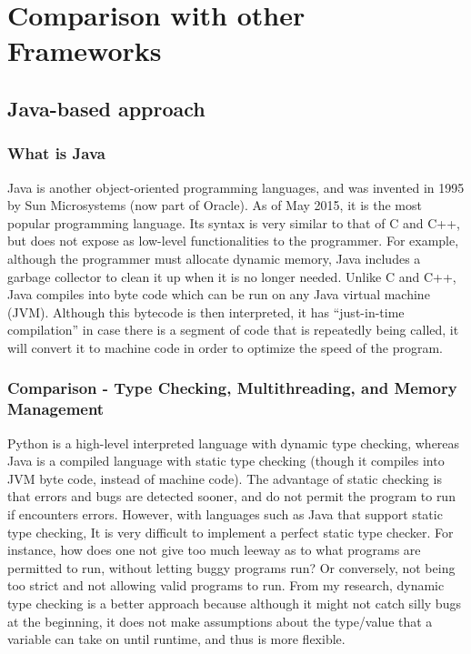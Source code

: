 \documentclass[letterpaper,twocolumn,10pt]{article}
\begin{document}
\section{Comparison with other Frameworks}
\subsection{Java-based approach}
\subsubsection{What is Java}
Java is another object-oriented programming languages, and was invented in 1995 by Sun Microsystems (now part of Oracle). As of May 2015, it is the most popular programming language. Its syntax is very similar to that of C and C++, but does not expose as low-level functionalities to the programmer. For example, although the programmer must allocate dynamic memory, Java includes a garbage collector to clean it up when it is no longer needed. Unlike C and C++, Java compiles into byte code which can be run on any Java virtual machine (JVM). Although this bytecode is then interpreted, it has “just-in-time compilation” in case there is a segment of code that is repeatedly being called, it will convert it to machine code in order to optimize the speed of the program. 

\subsubsection{Comparison - Type Checking, Multithreading, and Memory Management}
Python is a high-level interpreted language with dynamic type checking, whereas Java is a compiled language with static type checking (though it compiles into JVM byte code, instead of machine code). The advantage of static checking is that errors and bugs are detected sooner, and do not permit the program to run if encounters errors. However, with languages such as Java that support static type checking, It is very difficult to implement a perfect static type checker. For instance, how does one not give too much leeway as to what programs are permitted to run, without letting buggy programs run? Or conversely, not being too strict and not allowing valid programs to run. From my research, dynamic type checking is a better approach because although it might not catch silly bugs at the beginning, it does not make assumptions about the type/value that a variable can take on until runtime, and thus is more flexible.
\end{document}
